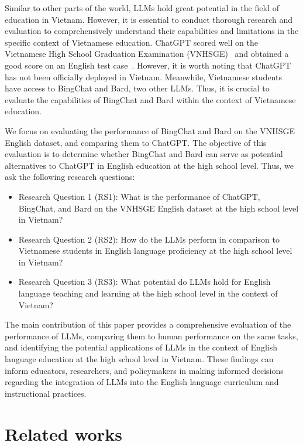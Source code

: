 \documentclass[11pt]{article}
\begin{document}
Similar to other parts of the world, LLMs hold great potential in the field of education in Vietnam. However, it is essential to conduct thorough research and evaluation to comprehensively understand their capabilities and limitations in the specific context of Vietnamese education. ChatGPT scored well on the Vietnamese High School Graduation Examination (VNHSGE)~\cite{dao2023exa} and obtained a good score on an English test case~\cite{dao2023eng}. However, it is worth noting that ChatGPT has not been officially deployed in Vietnam. Meanwhile, Vietnamese students have access to BingChat and Bard, two other LLMs. Thus, it is crucial to evaluate the capabilities of BingChat and Bard within the context of Vietnamese education.

We focus on evaluating the performance of BingChat and Bard on the VNHSGE English dataset, and comparing them to ChatGPT. The objective of this evaluation is to determine whether BingChat and Bard can serve as potential alternatives to ChatGPT in English education at the high school level.  Thus, we ask the following research questions: 
\begin{itemize}
	\item Research Question 1 (RS1): What is the performance of ChatGPT, BingChat, and Bard on the VNHSGE English dataset at the high school level in Vietnam?
	\item Research Question 2 (RS2): How do the LLMs perform in comparison to Vietnamese students in English language proficiency at the high school level in Vietnam?
	\item Research Question 3 (RS3): What potential do LLMs hold for English language teaching and learning at the high school level in the context of Vietnam? 
\end{itemize}

The main contribution of this paper provides a comprehensive evaluation of the performance of LLMs, comparing them to human performance on the same tasks, and identifying the potential applications of LLMs in the context of English language education at the high school level in Vietnam. These findings can inform educators, researchers, and policymakers in making informed decisions regarding the integration of LLMs into the English language curriculum and instructional practices. 



\section{Related works}
\end{document}
